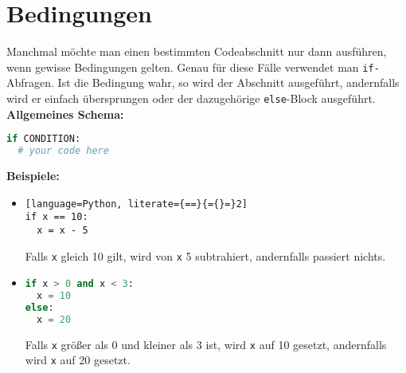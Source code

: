 \documentclass{article}
\begin{document}
	\section{Bedingungen}
	Manchmal möchte man einen bestimmten Codeabschnitt nur dann ausführen, wenn gewisse Bedingungen gelten. Genau für diese Fälle verwendet man \texttt{if-}Abfragen. Ist die Bedingung wahr, so wird der Abschnitt ausgeführt, andernfalls wird er einfach übersprungen oder der dazugehörige \texttt{else}-Block ausgeführt.\\
	\textbf{Allgemeines Schema:}
	\begin{lstlisting}[language=Python]
if CONDITION:
  # your code here
	\end{lstlisting}
	\textbf{Beispiele:}
	\begin{itemize}
		\item[] \begin{lstlisting}[language=Python, literate={==}{={}=}2]
if x == 10:
  x = x - 5
		\end{lstlisting}
		Falls \texttt{x} gleich 10 gilt, wird von \texttt{x} 5 subtrahiert, andernfalls passiert nichts.
		
		\item[] \begin{lstlisting}[language=Python]
if x > 0 and x < 3:
  x = 10
else:
  x = 20
		\end{lstlisting}
		Falls \texttt{x} größer als 0 und kleiner als 3 ist, wird \texttt{x} auf 10 gesetzt, andernfalls wird \texttt{x} auf 20 gesetzt.
	\end{itemize}
	
\end{document}
